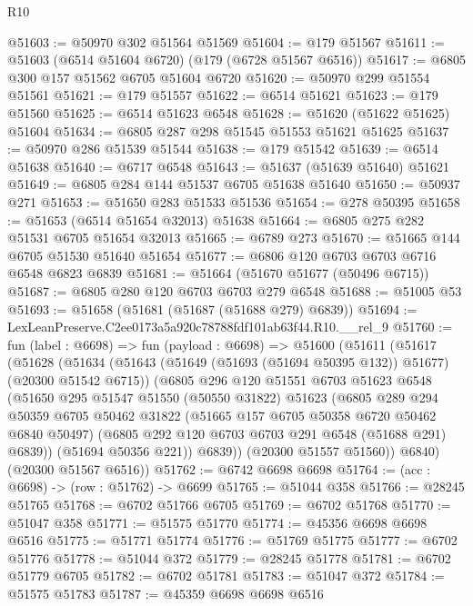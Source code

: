 \begin{lexlean}{R10}
\begin{coremodule}
@51603 := @50970 @302 @51564 @51569
@51604 := @179 @51567
@51611 := @51603 (@6514 @51604 @6720) (@179 (@6728 @51567 @6516))
@51617 := @6805 @300 @157 @51562 @6705 @51604 @6720
@51620 := @50970 @299 @51554 @51561
@51621 := @179 @51557
@51622 := @6514 @51621
@51623 := @179 @51560
@51625 := @6514 @51623 @6548
@51628 := @51620 (@51622 @51625) @51604
@51634 := @6805 @287 @298 @51545 @51553 @51621 @51625
@51637 := @50970 @286 @51539 @51544
@51638 := @179 @51542
@51639 := @6514 @51638
@51640 := @6717 @6548
@51643 := @51637 (@51639 @51640) @51621
@51649 := @6805 @284 @144 @51537 @6705 @51638 @51640
@51650 := @50937 @271
@51653 := @51650 @283 @51533 @51536
@51654 := @278 @50395
@51658 := @51653 (@6514 @51654 @32013) @51638
@51664 := @6805 @275 @282 @51531 @6705 @51654 @32013
@51665 := @6789 @273
@51670 := @51665 @144 @6705 @51530 @51640 @51654
@51677 := @6806 @120 @6703 @6703 @6716 @6548 @6823 @6839
@51681 := @51664 (@51670 @51677 (@50496 @6715))
@51687 := @6805 @280 @120 @6703 @6703 @279 @6548
@51688 := @51005 @53
@51693 := @51658 (@51681 (@51687 (@51688 @279) @6839))
@51694 := LexLeanPreserve.C2ee0173a5a920c78788fdf101ab63f44.R10.__rel_9
@51760 := fun (label : @6698) =>
  fun (payload : @6698) =>
  @51600
    (@51611
      (@51617
        (@51628
          (@51634
            (@51643 (@51649 (@51693 (@51694 @50395 @132)) @51677) (@20300 @51542 @6715))
            (@6805
              @296
              @120
              @51551
              @6703
              @51623
              @6548
              (@51650
                @295
                @51547
                @51550
                (@50550 @31822)
                @51623
                (@6805
                  @289
                  @294
                  @50359
                  @6705
                  @50462
                  @31822
                  (@51665 @157 @6705 @50358 @6720 @50462 @6840 @50497)
                  (@6805 @292 @120 @6703 @6703 @291 @6548 (@51688 @291) @6839))
                (@51694 @50356 @221))
              @6839))
          (@20300 @51557 @51560))
        @6840)
      (@20300 @51567 @6516))
@51762 := @6742 @6698 @6698
@51764 := (acc : @6698) -> (row : @51762) -> @6699
@51765 := @51044 @358
@51766 := @28245 @51765
@51768 := @6702 @51766 @6705
@51769 := @6702 @51768
@51770 := @51047 @358
@51771 := @51575 @51770
@51774 := @45356 @6698 @6698 @6516
@51775 := @51771 @51774
@51776 := @51769 @51775
@51777 := @6702 @51776
@51778 := @51044 @372
@51779 := @28245 @51778
@51781 := @6702 @51779 @6705
@51782 := @6702 @51781
@51783 := @51047 @372
@51784 := @51575 @51783
@51787 := @45359 @6698 @6698 @6516

\end{coremodule}
\end{lexlean}
